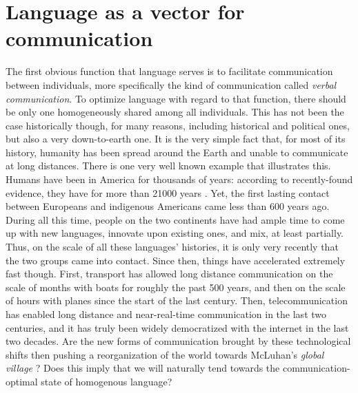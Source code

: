 \documentclass[../thesis.tex]{subfiles}
\begin{document}

\section{Language as a vector for communication}
The first obvious function that language serves is to facilitate communication between
individuals, more specifically the kind of communication called \emph{verbal
communication}. To optimize language with regard to that function, there should be only
one homogeneously shared among all individuals. This has not been the case historically
though, for many reasons, including historical and political ones, but also a very
down-to-earth one. It is the very simple fact that, for most of its history, humanity
has been spread around the Earth and unable to communicate at long distances. There is
one very well known example that illustrates this. Humans have been in America for
thousands of years: according to recently-found evidence, they have for more than
\SI{21000}{} years \cite{BennettEvidenceHumans2021}. Yet, the first lasting contact
between Europeans and indigenous Americans came less than 600 years ago. During all this
time, people on the two continents have had ample time to come up with new languages,
innovate upon existing ones, and mix, at least partially. Thus, on the scale of all
these languages' histories, it is only very recently that the two groups came into
contact. Since then, things have accelerated extremely fast though. First, transport has
allowed long distance communication on the scale of months with boats for roughly the
past 500 years, and then on the scale of hours with planes since the start of the last
century. Then, telecommunication has enabled long distance and near-real-time
communication in the last two centuries, and it has truly been widely democratized with
the internet in the last two decades. Are the new forms of communication brought by
these technological shifts then pushing a reorganization of the world towards McLuhan's
\emph{global village} \cite{McLuhanGutenbergGalaxy2008}? Does this imply that we will
naturally tend towards the communication-optimal state of homogenous language?

\end{document}
